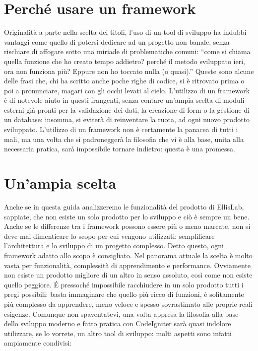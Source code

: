 \section*{Perch\'e usare un framework}
Originalità a parte nella scelta dei titoli, l'uso di un tool di sviluppo ha indubbi vantaggi come quello di potersi dedicare ad un progetto non banale, senza rischiare di affogare sotto una miriade di problematiche comuni: ``come si chiama quella funzione che ho creato tempo addietro? perché il metodo sviluppato ieri, ora non funziona più? Eppure non ho toccato nulla (o quasi).'' Queste sono alcune delle frasi che, chi ha scritto anche poche righe di codice, si è ritrovato prima o poi a pronunciare, magari con gli occhi levati al cielo. L'utilizzo di un framework è di notevole aiuto in questi frangenti, senza contare un'ampia scelta di moduli esterni già pronti per la validazione dei dati, la creazione di form o la gestione di un database: insomma, si eviterà di reinventare la ruota, ad ogni nuovo prodotto sviluppato. L'utilizzo di un framework non è certamente la panacea di tutti i mali, ma una volta che si padroneggerà la filosofia che vi è alla base, unita alla necessaria pratica, sarà impossibile tornare indietro: questa è una promessa.

\section*{Un'ampia scelta}
Anche se in questa guida analizzeremo le funzionalità del prodotto di EllisLab, sappiate, che non esiste un solo prodotto per lo sviluppo e ciò è sempre un bene. Anche se le differenze tra i framework possono essere più o meno marcate, non si deve mai dimenticare lo scopo per cui vengono utilizzati: semplificare l'architettura e lo sviluppo di un progetto complesso. Detto questo, ogni framework adatto allo scopo è consigliato. Nel panorama attuale la scelta è molto vasta per funzionalità, complessità di apprendimento e performance. Ovviamente non esiste un prodotto migliore di un altro in senso assoluto, così come non esiste quello peggiore. \'E pressoché impossibile racchiudere in un solo prodotto tutti i pregi possibili: basta immaginare che quello più ricco di funzioni, è solitamente più complesso da apprendere, meno veloce e spesso sovrastimato alle proprie reali esigenze. Comunque non spaventatevi, una volta appresa la filosofia alla base dello sviluppo moderno e fatto pratica con CodeIgniter sarà quasi indolore utilizzare, se lo vorrete, un altro tool di sviluppo: molti aspetti sono infatti ampiamente condivisi:

